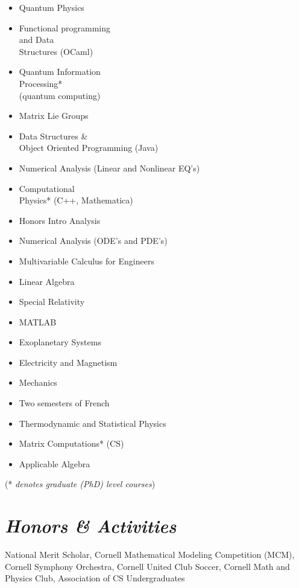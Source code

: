 \documentclass{res}
\begin{document}
{\begin{resume}
\begin{multicols}{3}
\begin{itemize}
\item{Quantum Physics}
\item{Functional programming\\
and Data\\
Structures (OCaml)}
\item{Quantum Information\\
Processing*\\
(quantum computing)}
\item{Matrix Lie Groups}
\item{Data Structures \&\\
Object Oriented Programming (Java)}
\item{Numerical Analysis (Linear and Nonlinear EQ's)}
\item{Computational\\
Physics* (C++, Mathematica)}
\item{Honors Intro Analysis}
\item{Numerical Analysis (ODE's and PDE's)}
\item{Multivariable Calculus for Engineers}
\item{Linear Algebra}
\item{Special Relativity}
\item{MATLAB}
\item{Exoplanetary Systems}
\item{Electricity and Magnetism}
\item{Mechanics}
\item{Two semesters of French}
\item{Thermodynamic and Statistical Physics}
\item{Matrix Computations* (CS)}
\item{Applicable Algebra}

\end{itemize}
\end{multicols}
\begin{center}
(* \textit{denotes graduate (PhD) level courses})
\end{center}
\section{\sl\bf  Honors \& Activities}
\begin{ncolumn}{1}
National Merit Scholar, Cornell Mathematical Modeling Competition (MCM), Cornell Symphony Orchestra, Cornell United Club Soccer, Cornell Math and Physics Club, Association of CS Undergraduates
\end{ncolumn}
\end{resume}
\vfill} %
\end{document}
